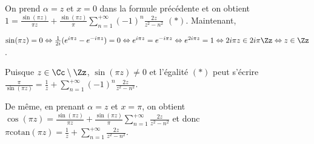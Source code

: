 {\begin{enumerate}
{On prend $\alpha=z$ et $x=0$ dans la formule précédente et on obtient $1=\frac{\sin(\pi z)}{\pi z}+\frac{\sin(\pi z)}{\pi}\sum_{n=1}^{+\infty}(-1)^n\frac{2z}{z^2-n^2}$ $(*)$. Maintenant,

\begin{center}
$\sin(\pi z)=0\Leftrightarrow\frac{1}{2i}(e^{i\pi z}-e^{-i\pi z})=0\Leftrightarrow e^{i\pi z}=e^{-i\pi z}\Leftrightarrow e^{2i\pi z}=1\Leftrightarrow 2i\pi z\in2i\pi\Zz\Leftrightarrow z\in\Zz$.
\end{center}

Puisque $z\in\Cc\setminus\Zz$, $\sin(\pi z)\neq 0$ et l'égalité $(*)$ peut s'écrire $\frac{\pi}{\sin(\pi z)}=\frac{1}{z}+\sum_{n=1}^{+\infty}(-1)^n\frac{2z}{z^2-n^2}$.

De même, en prenant $\alpha=z$ et $x=\pi$, on obtient $\cos(\pi z)=\frac{\sin(\pi z)}{\pi z}+\frac{\sin(\pi z)}{\pi}\sum_{n=1}^{+\infty}\frac{2z}{z^2-n^2}$ et donc $\pi\mathrm{cotan}(\pi z)=\frac{1}{z}+\sum_{n=1}^{+\infty}\frac{2z}{z^2-n^2}$.

\begin{center}
\end{center}}
\end{enumerate}
}
